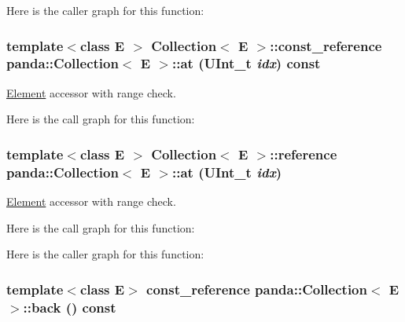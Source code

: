 Here is the caller graph for this function:\hypertarget{classpanda_1_1Collection_a39187584e51bc0f3cb2b4dd59f71dfa4}{
\subsubsection[{at}]{\setlength{\rightskip}{0pt plus 5cm}template$<$class E $>$ {\bf Collection}$<$ E $>$::{\bf const\_\-reference} {\bf panda::Collection}$<$ E $>$::at (UInt\_\-t {\em idx}) const}}
\label{classpanda_1_1Collection_a39187584e51bc0f3cb2b4dd59f71dfa4}


\hyperlink{classpanda_1_1Element}{Element} accessor with range check. 

Here is the call graph for this function:\hypertarget{classpanda_1_1Collection_a9a3c9aa1d2ba874da225156c9103b3fe}{
\subsubsection[{at}]{\setlength{\rightskip}{0pt plus 5cm}template$<$class E $>$ {\bf Collection}$<$ E $>$::{\bf reference} {\bf panda::Collection}$<$ E $>$::at (UInt\_\-t {\em idx})}}
\label{classpanda_1_1Collection_a9a3c9aa1d2ba874da225156c9103b3fe}


\hyperlink{classpanda_1_1Element}{Element} accessor with range check. 

Here is the call graph for this function:

Here is the caller graph for this function:\hypertarget{classpanda_1_1Collection_ae59b76d15bd761ecc824edf4222b76c7}{
\subsubsection[{back}]{\setlength{\rightskip}{0pt plus 5cm}template$<$class E$>$ {\bf const\_\-reference} {\bf panda::Collection}$<$ E $>$::back () const}}
\label{classpanda_1_1Collection_ae59b76d15bd761ecc824edf4222b76c7}


